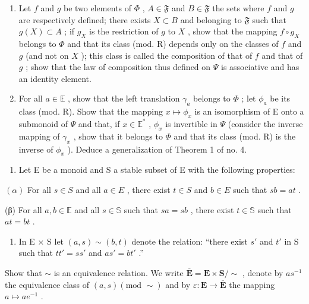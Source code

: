 \begin{enumerate}
\def\labelenumi{(\alph{enumi})}
\setcounter{enumi}{2}
\item
  Let \(f\) and \(g\) be two elements of \(\Phi\) , \(A \in \mathfrak{F}\) and \(B \in \mathfrak{F}\) the sets where \(f\) and \(g\) are respectively defined; there exists \(X \subset B\) and belonging to \(\mathfrak{F}\) such that \(g(X) \subset A\) ; if \(g_X\) is the restriction of \(g\) to \(X\) , show that the mapping \(f \circ g_X\) belongs to \(\Phi\) and that its class (mod. R) depends only on the classes of \(f\) and \(g\) (and not on \(X\) ); this class is called the composition of that of \(f\) and that of \(g\) ; show that the law of composition thus defined on \(\Psi\) is associative and has an identity element.
\item
  For all \(a \in \mathbb{E}\) , show that the left translation \(\gamma_{a}\) belongs to \(\Phi\) ; let \(\phi_{a}\) be its class (mod. R). Show that the mapping \(x \mapsto \phi_{x}\) is an isomorphism of E onto a submonoid of \(\Psi\) and that, if \(x \in \mathbb{E}^{*}\) , \(\phi_{x}\) is invertible in \(\Psi\) (consider the inverse mapping of \(\gamma_{x}\) , show that it belongs to \(\Phi\) and that its class (mod. R) is the inverse of \(\phi_{x}\) ). Deduce a generalization of Theorem 1 of no. 4.
\end{enumerate}

\begin{enumerate}
\def\labelenumi{\arabic{enumi}.}
\setcounter{enumi}{16}
\tightlist
\item
  Let E be a monoid and S a stable subset of E with the following properties:
\end{enumerate}

\((\alpha)\) For all \(s \in S\) and all \(a \in E\) , there exist \(t \in S\) and \(b \in E\) such that \(sb = at\) .

(β) For all \(a, b \in \mathbb{E}\) and all \(s \in \mathbb{S}\) such that \(sa = sb\) , there exist \(t \in \mathbb{S}\) such that \(at = bt\) .

\begin{enumerate}
\def\labelenumi{(\alph{enumi})}
\tightlist
\item
  In E × S let \((a, s) \sim (b, t)\) denote the relation: ``there exist \(s'\) and \(t'\) in S such that \(tt' = ss'\) and \(as' = bt'\) .''
\end{enumerate}

Show that \(\sim\) is an equivalence relation. We write \(\overline{\mathbf{E}} = \mathbf{E} \times \mathbf{S}/\sim\) , denote by \(as^{-1}\) the equivalence class of \((a, s) (\text{mod } \sim)\) and by \(\varepsilon: \mathbf{E} \to \overline{\mathbf{E}}\) the mapping \(a \mapsto ae^{-1}\) .

